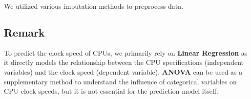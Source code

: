 We utilized various imputation methods to preprocess data.\\

\subsection{Remark}
To predict the clock speed of CPUs, we primarily rely on \textbf{Linear Regression} as it directly models the relationship between the CPU specifications (independent variables) and the clock speed (dependent variable). \textbf{ANOVA} can be used as a supplementary method to understand the influence of categorical variables on CPU clock speeds, but it is not essential for the prediction model itself.

\newpage